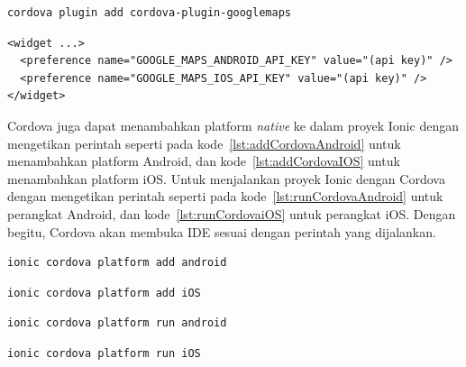 \begin{lstlisting}[label={lst:installGMapsCordova}, caption=Kode untuk Menginstal \textit{Plugin} Cordova Google Maps]
cordova plugin add cordova-plugin-googlemaps
\end{lstlisting} 

\begin{lstlisting}[label={lst:apikeyGMapsCordova}, caption=Kode untuk Mengatur API Key untuk \textit{Plugin} Cordova Google Maps]
<widget ...>
  <preference name="GOOGLE_MAPS_ANDROID_API_KEY" value="(api key)" />
  <preference name="GOOGLE_MAPS_IOS_API_KEY" value="(api key)" />
</widget>
\end{lstlisting} 

Cordova juga dapat menambahkan platform \textit{native} ke dalam proyek Ionic dengan mengetikan perintah seperti pada kode~\ref{lst:addCordovaAndroid} untuk menambahkan platform Android, dan kode~\ref{lst:addCordovaIOS} untuk menambahkan platform iOS. Untuk menjalankan proyek Ionic dengan Cordova dengan mengetikan perintah seperti pada kode~\ref{lst:runCordovaAndroid} untuk perangkat Android, dan kode~\ref{lst:runCordovaiOS} untuk perangkat iOS. Dengan begitu, Cordova akan membuka IDE sesuai dengan perintah yang dijalankan.

\begin{lstlisting}[label={lst:addCordovaAndroid}, caption=Kode untuk Menambahkan Platform Android dengan Cordova]
ionic cordova platform add android
\end{lstlisting} 

\begin{lstlisting}[label={lst:addCordovaIOS}, caption=Kode untuk Menambahkan Platform iOS dengan Cordova]
ionic cordova platform add iOS
\end{lstlisting} 

\begin{lstlisting}[label={lst:runCordovaAndroid}, caption=Kode untuk Membuat Aplikasi Cordova Untuk Perangkat Android]
ionic cordova platform run android
\end{lstlisting} 

\begin{lstlisting}[label={lst:runCordovaiOS}, caption=Kode untuk Membuat Aplikasi Cordova Untuk Perangkat iOS]
ionic cordova platform run iOS
\end{lstlisting} 

